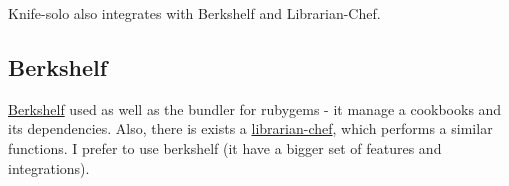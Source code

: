 Knife-solo also integrates with Berkshelf and Librarian-Chef.

\subsection{Berkshelf}

\href{http://berkshelf.com/}{Berkshelf} used as well as the bundler for rubygems - it manage a cookbooks and its dependencies. Also, there is exists a \href{https://github.com/applicationsonline/librarian-chef}{librarian-chef}, which performs a similar functions. I prefer to use berkshelf (it have a bigger set of features and integrations).
